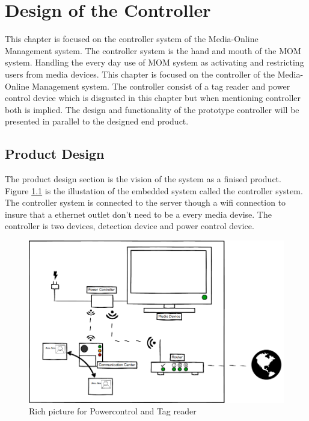\chapter{Design of the Controller}
This chapter is focused on the controller system of the Media-Online Management system. The controller system is the hand and mouth of the MOM system. Handling the every day use of MOM system as activating and restricting users from media devices.\newline
This chapter is focused on the controller of the Media-Online Management system. The controller consist of a tag reader and power control device which is disgusted in this chapter but when mentioning controller both is implied. \newline
The design and functionality of the prototype controller will be presented in parallel to the designed end product. \newline

\section{Product Design}

The product design section is the vision of the system as a finised product. Figure \ref{fig:Power&Tagdevice} is the illustation of the embedded system called the controller system. The controller system is connected to the server though a wifi connection to insure that a ethernet outlet don't need to be a every media devise.  
The controller is two devices, detection device and power control device.

\begin{figure}[h]
	\centering
		\includegraphics[width=1.00\textwidth]{images/Power&Tagdevice.png}
	\caption{Rich picture for Powercontrol and Tag reader}
	\label{fig:Power&Tagdevice}
\end{figure}

